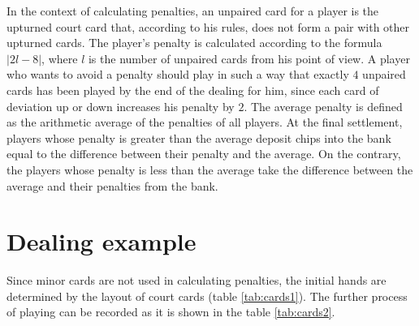 In the context of calculating penalties, an unpaired card for a player is the upturned court card that, according to his rules, does not form a pair with other upturned cards. The player's penalty is calculated according to the formula $\left|2l-8\right|$, where $l$ is the number of unpaired cards from his point of view. A player who wants to avoid a penalty should play in such a way that exactly $4$ unpaired cards has been played by the end of the dealing for him, since each card of deviation up or down increases his penalty by $2$. The average penalty is defined as the arithmetic average of the penalties of all players. At the final settlement, players whose penalty is greater than the average deposit chips into the bank equal to the difference between their penalty and the average. On the contrary, the players whose penalty is less than the average take the difference between the average and their penalties from the bank. %

\section{Dealing example}\label{app:D2}

Since minor cards are not used in calculating penalties, the initial hands are determined by the layout of court cards (table \ref{tab:cards1}). The further process of playing can be recorded as it is shown in the table \ref{tab:cards2}. %

